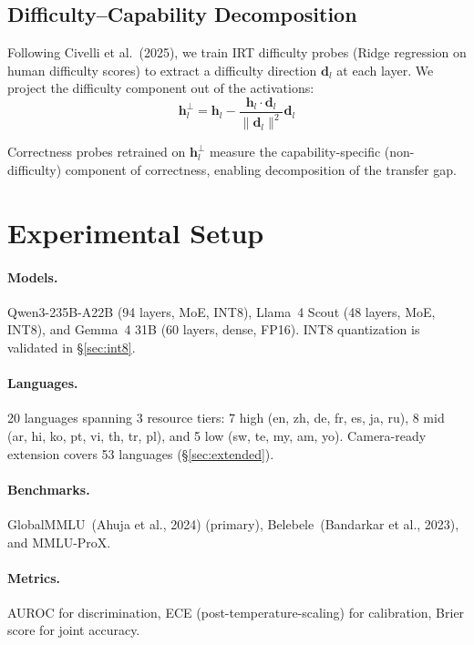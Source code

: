 \documentclass[11pt,a4paper]{article}
\begin{document}
\subsection{Difficulty--Capability Decomposition}
\label{sec:decomp_method}

Following Civelli et al.~(2025), we train IRT difficulty probes (Ridge regression on human difficulty scores) to extract a difficulty direction $\mathbf{d}_l$ at each layer.
We project the difficulty component out of the activations:
\begin{equation}
\mathbf{h}_l^{\perp} = \mathbf{h}_l - \frac{\mathbf{h}_l \cdot \mathbf{d}_l}{\|\mathbf{d}_l\|^2}\mathbf{d}_l
\end{equation}

Correctness probes retrained on $\mathbf{h}_l^{\perp}$ measure the capability-specific (non-difficulty) component of correctness, enabling decomposition of the transfer gap.

\section{Experimental Setup}

\paragraph{Models.}
Qwen3-235B-A22B (94 layers, MoE, INT8), Llama~4 Scout (48 layers, MoE, INT8), and Gemma~4 31B (60 layers, dense, FP16).
INT8 quantization is validated in \S\ref{sec:int8}.

\paragraph{Languages.}
20 languages spanning 3 resource tiers: 7 high (en, zh, de, fr, es, ja, ru), 8 mid (ar, hi, ko, pt, vi, th, tr, pl), and 5 low (sw, te, my, am, yo).
Camera-ready extension covers 53 languages (\S\ref{sec:extended}).

\paragraph{Benchmarks.}
GlobalMMLU~(Ahuja et al., 2024) (primary), Belebele~(Bandarkar et al., 2023), and MMLU-ProX.

\paragraph{Metrics.}
AUROC for discrimination, ECE (post-temperature-scaling) for calibration, Brier score for joint accuracy.
\end{document}
